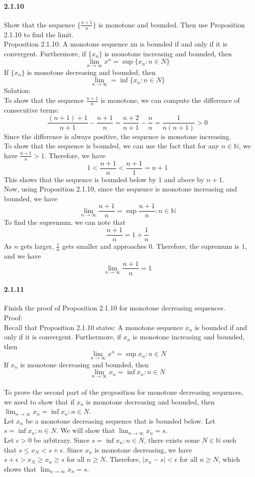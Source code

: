 \documentclass{article}
\begin{document}
\paragraph{2.1.10}
Show that the sequence $\{\frac{n+1}{n}\}$ is monotone and bounded. Then use Proposition 2.1.10
to find the limit.\\
Proposition 2.1.10: A monotone sequence {xn} is bounded if and only if it is convergent. Furthermore, if $\{x_n\}$ is monotone increasing and bounded, then
$$\lim_{n\to \infty}x^n=\sup\{x_n:n\in N\}$$
If $\{x_n\}$ is monotone decreasing and bounded, then
$$\lim_{n\to \infty}=\inf\{x_n:n\in N\}$$
Solution:\\
To show that the sequence ${\frac{n+1}{n}}$ is monotone, we can compute the difference of consecutive terms:
$$\frac{(n+1)+1}{n+1} - \frac{n+1}{n} = \frac{n+2}{n+1} - \frac{n}{n} = \frac{1}{n(n+1)} > 0$$
Since the difference is always positive, the sequence is monotone increasing.\\
To show that the sequence is bounded, we can use the fact that for any $n\in \mathbb{N}$, we have $\frac{n+1}{n} > 1$. Therefore, we have
$$1 < \frac{n+1}{n} < \frac{n+1}{1} = n+1$$
This shows that the sequence is bounded below by $1$ and above by $n+1$.\\
Now, using Proposition 2.1.10, since the sequence is monotone increasing and bounded, we have
$$\lim_{n\to \infty} \frac{n+1}{n} = \sup{\frac{n+1}{n} : n \in \mathbb{N}}$$
To find the supremum, we can note that
$$\frac{n+1}{n} = 1 + \frac{1}{n}$$
As $n$ gets larger, $\frac{1}{n}$ gets smaller and approaches $0$. Therefore, the supremum is $1$, and we have
$$\lim_{n\to \infty} \frac{n+1}{n} = 1$$
\paragraph{2.1.11}
Finish the proof of Proposition 2.1.10 for monotone decreasing sequences.\\
Proof:\\
Recall that Proposition 2.1.10 states: A monotone sequence ${x_n}$ is bounded if and only if it is convergent. Furthermore, if ${x_n}$ is monotone increasing and bounded, then
$$\lim_{n\to \infty}x^n=\sup{x_n:n\in N}$$
If ${x_n}$ is monotone decreasing and bounded, then
$$\lim_{n\to \infty}x_n=\inf{x_n:n\in N}$$\\
To prove the second part of the proposition for monotone decreasing sequences, we need to show that if ${x_n}$ is monotone decreasing and bounded, then $\lim_{n\to \infty}x_n=\inf{x_n:n\in N}$.\\
Let ${x_n}$ be a monotone decreasing sequence that is bounded below. Let $s = \inf{x_n:n\in N}$. We will show that $\lim_{n\to \infty}x_n = s$.\\
Let $\epsilon > 0$ be arbitrary. Since $s = \inf{x_n:n\in N}$, there exists some $N\in \mathbb{N}$ such that $s\leq x_N < s+\epsilon$. Since ${x_n}$ is monotone decreasing, we have $s+\epsilon > x_N \geq x_n \geq s$ for all $n\geq N$. Therefore, $|x_n - s| < \epsilon$ for all $n\geq N$, which shows that $\lim_{n\to \infty}x_n = s$.
\end{document}
